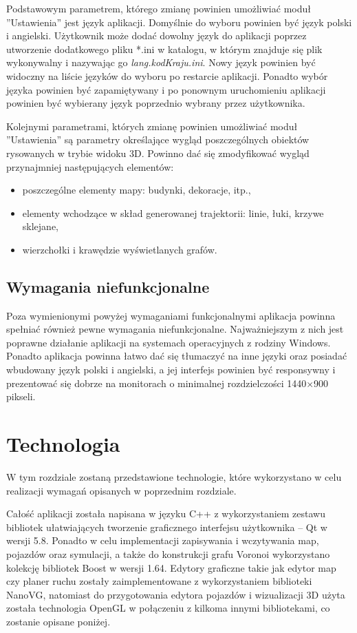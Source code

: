 \documentclass[a4paper,11pt,twoside]{report}
\theoremstyle{definition}
\begin{document}
Podstawowym parametrem, którego zmianę powinien umożliwiać moduł ''Ustawienia'' jest język aplikacji. Domyślnie do wyboru powinien być język polski i angielski. Użytkownik może dodać dowolny język do aplikacji poprzez utworzenie dodatkowego pliku *.ini w katalogu, w którym znajduje się plik wykonywalny i nazywając go \textit{lang.kodKraju.ini}. Nowy język powinien być widoczny na liście języków do wyboru po restarcie aplikacji. Ponadto wybór języka powinien być zapamiętywany i po ponownym uruchomieniu aplikacji powinien być wybierany język poprzednio wybrany przez użytkownika.

Kolejnymi parametrami, których zmianę powinien umożliwiać moduł ''Ustawienia'' są parametry określające wygląd poszczególnych obiektów rysowanych w trybie widoku 3D. Powinno dać się zmodyfikować wygląd przynajmniej następujących elementów:
\begin{itemize}
	\item poszczególne elementy mapy: budynki, dekoracje, itp.,
	\item elementy wchodzące w skład generowanej trajektorii: linie, łuki, krzywe sklejane,
	\item wierzchołki i krawędzie wyświetlanych grafów.
\end{itemize}

\section{Wymagania niefunkcjonalne}

Poza wymienionymi powyżej wymaganiami funkcjonalnymi aplikacja powinna spełniać również pewne wymagania niefunkcjonalne. Najważniejszym z nich jest poprawne działanie aplikacji na systemach operacyjnych z rodziny Windows. Ponadto aplikacja powinna łatwo dać się tłumaczyć na inne języki oraz posiadać wbudowany język polski i angielski, a jej interfejs powinien być responsywny i prezentować się dobrze na monitorach o minimalnej rozdzielczości 1440×900 pikseli.

\chapter{Technologia}

W tym rozdziale zostaną przedstawione technologie, które wykorzystano w celu realizacji wymagań opisanych w poprzednim rozdziale.

Całość aplikacji została napisana w języku C++ z wykorzystaniem zestawu bibliotek ułatwiających tworzenie graficznego interfejsu użytkownika – Qt w wersji 5.8. Ponadto w celu implementacji zapisywania i wczytywania map, pojazdów oraz symulacji, a także do konstrukcji grafu Voronoi wykorzystano kolekcję bibliotek Boost w wersji 1.64. Edytory graficzne takie jak edytor map czy planer ruchu zostały zaimplementowane z wykorzystaniem biblioteki NanoVG, natomiast do przygotowania edytora pojazdów i wizualizacji 3D użyta została technologia OpenGL w połączeniu z kilkoma innymi bibliotekami, co zostanie opisane poniżej. 
\end{document}
